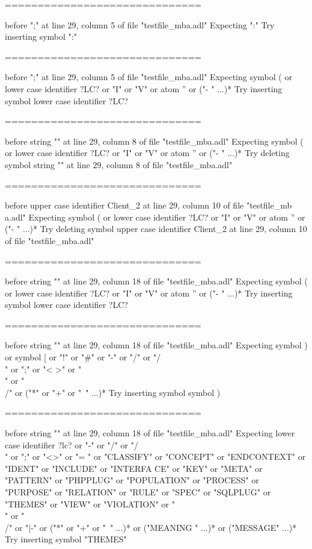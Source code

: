 \begin{description}
\begin{haskell}
==============================

before ";" at line 29, column 5 of file "testfile_mba.adl"
Expecting ":"
Try inserting symbol ":"

==============================

before ";" at line 29, column 5 of file "testfile_mba.adl"
Expecting symbol ( or lower case identifier ?LC? or "I" or "V" or atom '' or ("-
" ...)*
Try inserting symbol lower case identifier ?LC?

==============================

before string "" at line 29, column 8 of file "testfile_mba.adl"
Expecting symbol ( or lower case identifier ?LC? or "I" or "V" or atom '' or ("-
" ...)*
Try deleting symbol string "" at line 29, column 8 of file "testfile_mba.adl"

==============================

before upper case identifier Client_2 at line 29, column 10 of file "testfile_mb
a.adl"
Expecting symbol ( or lower case identifier ?LC? or "I" or "V" or atom '' or ("-
" ...)*
Try deleting symbol upper case identifier Client_2 at line 29, column 10 of file
 "testfile_mba.adl"

==============================

before string "" at line 29, column 18 of file "testfile_mba.adl"
Expecting symbol ( or lower case identifier ?LC? or "I" or "V" or atom '' or ("-
" ...)*
Try inserting symbol lower case identifier ?LC?

==============================

before string "" at line 29, column 18 of file "testfile_mba.adl"
Expecting symbol ) or symbol [ or "!" or "#" or "-" or "/" or "/\\" or ";" or "<
>" or "\\" or "\\/" or ("*" or "+" or "~" ...)*
Try inserting symbol symbol )

==============================

before string "" at line 29, column 18 of file "testfile_mba.adl"
Expecting lower case identifier ?lc? or "-" or "/" or "/\\" or ";" or "<>" or "=
" or "CLASSIFY" or "CONCEPT" or "ENDCONTEXT" or "IDENT" or "INCLUDE" or "INTERFA
CE" or "KEY" or "META" or "PATTERN" or "PHPPLUG" or "POPULATION" or "PROCESS" or
 "PURPOSE" or "RELATION" or "RULE" or "SPEC" or "SQLPLUG" or "THEMES" or "VIEW"
or "VIOLATION" or "\\" or "\\/" or "|-" or ("*" or "+" or "~" ...)* or ("MEANING
" ...)* or ("MESSAGE" ...)*
Try inserting symbol "THEMES"


\end{haskell}
\end{description}
